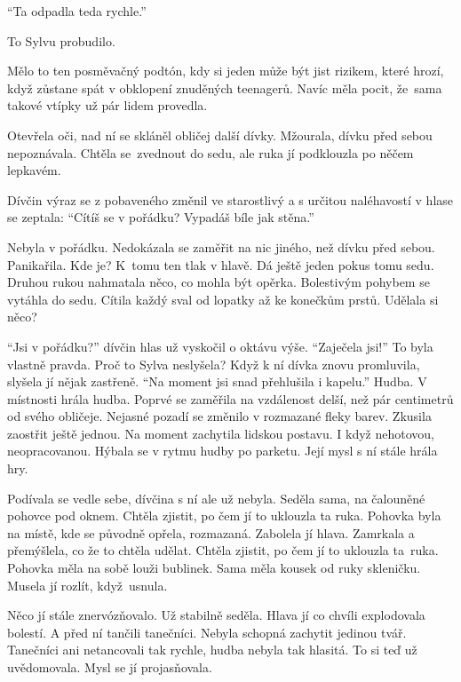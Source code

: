 \documentclass[10pt]{article}
\begin{document}
\begin{spacing}{1}
	\enquote{Ta odpadla teda rychle.}\par
	To Sylvu probudilo.\par
	Mělo to ten posměvačný podtón, kdy si jeden může být jist rizikem,
	které hrozí, když zůstane spát v obklopení znuděných teenagerů.
	Navíc měla pocit, že~sama takové vtípky už pár lidem provedla.\par
	Otevřela oči, nad ní se skláněl obličej další dívky.
	Mžourala, dívku před sebou nepoznávala.
	Chtěla se~zvednout do sedu, ale ruka jí podklouzla po něčem lepkavém.\par
	Dívčin výraz se z pobaveného změnil ve starostlivý
	a s určitou naléhavostí v hlase se zeptala:
	\enquote{Cítíš se v pořádku? Vypadáš bíle jak stěna.}\par
	Nebyla v pořádku.
	Nedokázala se zaměřit na nic jiného, než dívku před sebou.
	Panikařila.
	Kde je?
	K~tomu ten tlak v hlavě.
	Dá ještě jeden pokus tomu sedu.
	Druhou rukou nahmatala něco, co mohla být opěrka.
	Bolestivým pohybem se vytáhla do sedu.
	Cítila každý sval od lopatky až ke konečkům prstů.
	Udělala si něco?\par
	\enquote{Jsi v pořádku?} dívčin hlas už vyskočil o oktávu výše.
	\enquote{Zaječela jsi!}
	To byla vlastně pravda.
	Proč to Sylva neslyšela? %
	Když k ní dívka znovu promluvila, slyšela jí nějak zastřeně.
	\enquote{Na moment jsi snad přehlušila i kapelu.}
	Hudba.
	V místnosti hrála hudba.
	Poprvé se zaměřila na vzdálenost delší,
	než pár centimetrů od svého obličeje.
	Nejasné pozadí se změnilo v rozmazané fleky barev.
	Zkusila zaostřit ještě jednou.
	Na moment zachytila lidskou postavu.
	I když nehotovou, neopracovanou.
	Hýbala se v rytmu hudby po parketu.
	Její mysl s ní stále hrála hry.\par
	Podívala se vedle sebe, dívčina s ní ale už nebyla.
	Seděla sama, na čalouněné pohovce pod oknem.
	Chtěla zjistit, po čem jí to uklouzla ta ruka.
	Pohovka byla na místě, kde se původně opřela, rozmazaná.
	Zabolela jí hlava.
	Zamrkala a přemýšlela, co že to chtěla udělat.
	Chtěla zjistit, po čem jí to uklouzla ta~ruka.
	Pohovka měla na sobě louži bublinek.
	Sama měla kousek od ruky skleničku.
	Musela jí rozlít, když~usnula.\par
	Něco jí stále znervózňovalo.
	Už stabilně seděla.
	Hlava jí co chvíli explodovala bolestí.
	A před ní tančili tanečníci.
	Nebyla schopná zachytit jedinou tvář.	
	Tanečníci ani netancovali tak rychle, hudba nebyla tak hlasitá.
	To si teď už uvědomovala.
	Mysl se jí projasňovala.

\end{spacing}
\end{document}
